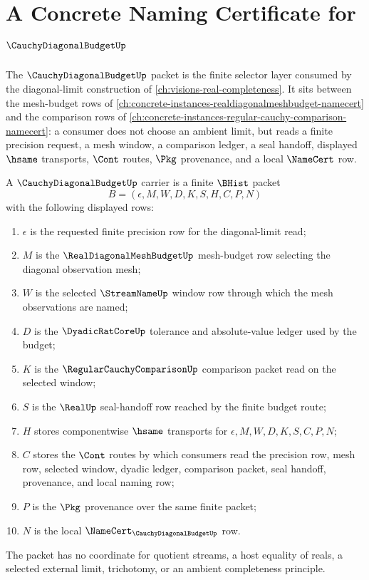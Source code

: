 \chapter{A Concrete Naming Certificate for $\CauchyDiagonalBudgetUp$}
\label{ch:concrete-instances-cauchydiagonalbudget-namecert}

The $\CauchyDiagonalBudgetUp$ packet is the finite selector layer consumed by the diagonal-limit construction of \autoref{ch:visions-real-completeness}. It sits between the mesh-budget rows of \autoref{ch:concrete-instances-realdiagonalmeshbudget-namecert} and the comparison rows of \autoref{ch:concrete-instances-regular-cauchy-comparison-namecert}: a consumer does not choose an ambient limit, but reads a finite precision request, a mesh window, a comparison ledger, a seal handoff, displayed $\hsame$ transports, $\Cont$ routes, $\Pkg$ provenance, and a local $\NameCert$ row.

\begin{definition}
\label{def:cauchy-diagonal-budget-carrier}
A $\CauchyDiagonalBudgetUp$ carrier is a finite $\BHist$ packet
$$
B=(\epsilon,M,W,D,K,S,H,C,P,N)
$$
with the following displayed rows:
\begin{enumerate}
\item $\epsilon$ is the requested finite precision row for the diagonal-limit read;
\item $M$ is the $\RealDiagonalMeshBudgetUp$ mesh-budget row selecting the diagonal observation mesh;
\item $W$ is the selected $\StreamNameUp$ window row through which the mesh observations are named;
\item $D$ is the $\DyadicRatCoreUp$ tolerance and absolute-value ledger used by the budget;
\item $K$ is the $\RegularCauchyComparisonUp$ comparison packet read on the selected window;
\item $S$ is the $\RealUp$ seal-handoff row reached by the finite budget route;
\item $H$ stores componentwise $\hsame$ transports for $\epsilon,M,W,D,K,S,C,P,N$;
\item $C$ stores the $\Cont$ routes by which consumers read the precision row, mesh row, selected window, dyadic ledger, comparison packet, seal handoff, provenance, and local naming row;
\item $P$ is the $\Pkg$ provenance over the same finite packet;
\item $N$ is the local $\NameCert_{\CauchyDiagonalBudgetUp}$ row.
\end{enumerate}
The packet has no coordinate for quotient streams, a host equality of reals, a selected external limit, trichotomy, or an ambient completeness principle.
\end{definition}

